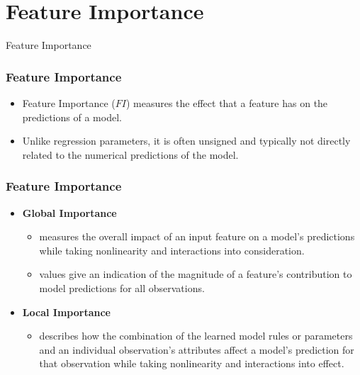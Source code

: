 \section{Feature Importance}

\begin{frame}[c]
\Huge{\centerline{Feature Importance}}
\end{frame}


\begin{frame}\frametitle{Feature Importance}

	\begin{itemize}			
		\item Feature Importance ($FI$) measures the effect that a feature has on the predictions of a model.  
		\item Unlike regression parameters, it is often unsigned and typically not directly related to the numerical predictions of the model.
	\end{itemize}
\end{frame}

\begin{frame}\frametitle{Feature Importance}
	\begin{itemize}			
		\item \textbf{Global Importance}
			\begin{itemize} 
				\item measures the overall impact of an input feature on a model's predictions while taking nonlinearity and interactions into consideration.
				\item values give an indication of the magnitude of a feature's contribution to model predictions for all observations.		
			\end{itemize}
			\bigskip
		\item \textbf{Local Importance}
			\begin{itemize} 
				\item describes how the combination of the learned model rules or parameters and an individual observation's attributes affect a model's prediction for that observation while taking nonlinearity and interactions into effect. 
	\end{itemize}	
	\end{itemize}
\end{frame}


